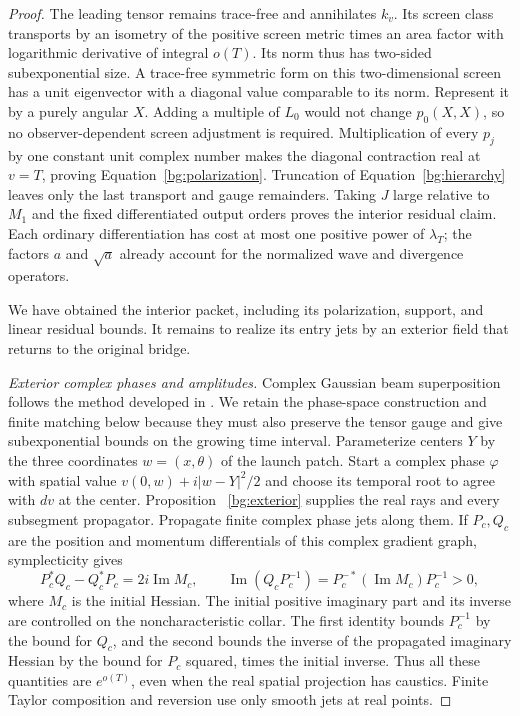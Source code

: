 \begin{proof}
The leading tensor remains trace-free and annihilates $k_v$.
Its screen class transports by an isometry of the positive screen
metric times an area factor with logarithmic derivative of
integral $o(T)$.  Its norm thus has two-sided subexponential
size.  A trace-free symmetric form on this two-dimensional screen
has a unit eigenvector with a diagonal value comparable to its
norm.  Represent it by a purely angular $X$.  Adding a multiple
of $L_0$ would not change $p_0(X,X)$, so no observer-dependent
screen adjustment is required.  Multiplication of every $p_j$
by one constant unit complex number makes the diagonal contraction
real at $v=T$, proving Equation~\eqref{bg:polarization}.
Truncation of Equation~\eqref{bg:hierarchy} leaves only the last
transport and gauge remainders.  Taking $J$ large relative to
$M_1$ and the fixed differentiated output orders proves the
interior residual claim.  Each ordinary differentiation has cost
at most one positive power of $\lambda_T$; the factors $a$ and
$\sqrt a$ already account for the normalized wave and divergence
operators.

We have obtained the interior packet, including its polarization,
support, and linear residual bounds. It remains to realize its entry
jets by an exterior field that returns to the original bridge.

\emph{Exterior complex phases and amplitudes.}
Complex Gaussian beam superposition follows the method developed in
\cite{Ralston1982,Tanushev2008,LiuRunborgTanushev2013}. We retain the
phase-space construction and finite matching below because they must
also preserve the tensor gauge and give subexponential bounds on the
growing time interval. Parameterize centers $Y$ by the three
coordinates $w=(x,\theta)$ of the launch patch.  Start a complex
phase $\varphi$ with spatial value $v(0,w)+i|w-Y|^2/2$ and choose its
temporal root to agree with $dv$ at the center.  Proposition~
\ref{bg:exterior} supplies the real rays and every subsegment
propagator.  Propagate finite complex phase jets along them.  If
$P_c,Q_c$ are the position and momentum differentials of this
complex gradient graph, symplecticity gives
\begin{equation}\label{bg:complex-symplectic}
 P_c^*Q_c-Q_c^*P_c=2i\operatorname{Im}M_c,
 \qquad
 \operatorname{Im}(Q_cP_c^{-1})
           =P_c^{-*}(\operatorname{Im}M_c)P_c^{-1}>0,
\end{equation}
where $M_c$ is the initial Hessian.  The initial positive imaginary
part and its inverse are controlled on the noncharacteristic
collar.  The first identity bounds $P_c^{-1}$ by the bound for
$Q_c$, and the second bounds the inverse of the propagated
imaginary Hessian by the bound for $P_c$ squared, times the
initial inverse.  Thus all these quantities are $e^{o(T)}$, even
when the real spatial projection has caustics.  Finite Taylor
composition and reversion use only smooth jets at real points.


\end{proof}
